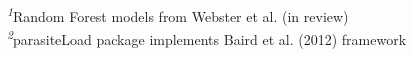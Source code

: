 \begin{minipage}{\linewidth}
\textsuperscript{\textit{1}}Random Forest models from Webster et al. (in review)\\
\textsuperscript{\textit{2}}parasiteLoad package implements Baird et al. (2012) framework\\
\end{minipage}

